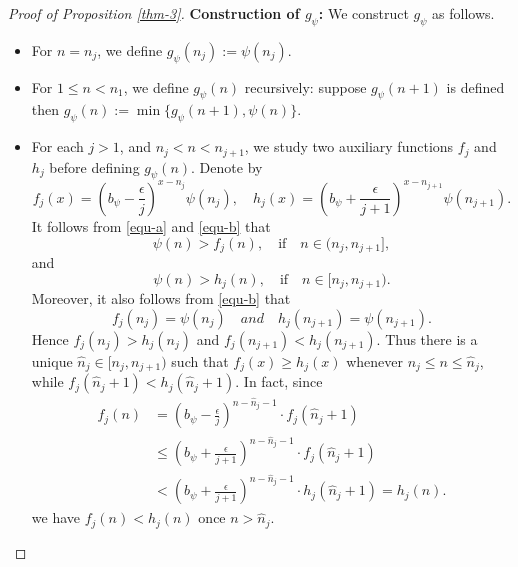 \documentclass[12pt,reqno]{amsart}
\renewcommand{\=}{\coloneqq}
\theoremstyle{plain}
\begin{document}
\begin{proof}[Proof of Proposition \ref{thm-3}]
\textbf{Construction of $g_{\psi}$:} We construct $g_{\psi}$ as follows.
\begin{itemize}
\item For $n=n_j$, we define $g_\psi(n_j):= \psi(n_j)$.
\item For $1\leq n<n_1$, we define $g_\psi(n)$ recursively: suppose $g_{\psi}(n+1)$ is defined then $g_\psi(n):= \min\{g_\psi(n+1),\psi(n)\}$.
\item For each $j>1$, and $n_j<n<n_{j+1}$, we study two auxiliary functions $f_{j}$ and $h_{j}$ before defining $g_\psi(n)$. Denote by
\begin{equation}\label{equ-b}
f_j(x) = \left(b_{\psi}-\frac{\epsilon}{j}\right)^{x-n_j} \psi(n_j), \quad h_j(x) = \left(b_{\psi}+\frac{\epsilon}{j+1}\right)^{x-n_{j+1}} \psi(n_{j+1}).
\end{equation}
It follows from \eqref{equ-a} and \eqref{equ-b} that
\begin{equation}\label{equ-a*(1)}
\psi(n)>f_j(n), \quad \mbox{if} \quad n \in (n_j,n_{j+1}],
\end{equation}
and
\begin{equation}\label{equ-a*(2)}
\psi(n)>h_j(n), \quad \mbox{if} \quad n \in [n_j,n_{j+1}).
\end{equation}
Moreover, it also follows from \eqref{equ-b} that
\begin{equation}\label{equ-c}
f_j(n_j) = \psi(n_j) \quad and \quad h_j(n_{j+1}) = \psi(n_{j+1}).
\end{equation}
Hence $f_j(n_j) > h_j(n_j)$ and $f_j(n_{j+1}) < h_j(n_{j+1})$. Thus there is a unique $\hat{n}_j\in [n_j, n_{j+1})$ such that $f_j(x)\geq h_j(x)$ whenever $n_j \leq n\leq \hat{n}_j$, while $f_j(\hat{n}_j + 1) < h_j(\hat{n}_j + 1)$. In fact, since
\begin{align*}
    f_j(n) &= \left(b_{\psi}-\frac{\epsilon}{j}\right)^{n-\hat{n}_j-1}\cdot f_j(\hat{n}_j+1)\\
    &\leq \left(b_{\psi}+\frac{\epsilon}{j+1}\right)^{n-\hat{n}_j-1}\cdot f_j(\hat{n}_j+1)\\
    &< \left(b_{\psi}+\frac{\epsilon}{j+1}\right)^{n-\hat{n}_j-1}\cdot h_j(\hat{n}_j+1)=h_j(n).
\end{align*}
we have $f_j(n) < h_j(n)$ once $n>\hat{n}_j$.


\end{itemize}
\end{proof}
\end{document}
